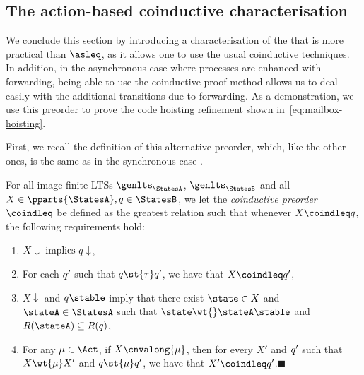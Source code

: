 

\subsection{The action-based coinductive characterisation}
\label{sec:coind-char}

We conclude this section by introducing a characterisation of the
\mustpreorder that is more practical than $\asleq$, as it allows one
to use the usual coinductive techniques.
%
In addition, in the asynchronous case where processes are enhanced with
forwarding, being able to use the coinductive proof method allows us to deal
easily with the additional transitions due to forwarding.
%
As a demonstration, we use this preorder to prove the code hoisting
refinement shown in~\eqref{eq:mailbox-hoisting}.

First, we recall the definition of this alternative preorder,
which, like the other ones, is the same as in the synchronous case
\cite{DBLP:journals/jacm/AcetoH92,DBLP:conf/concur/LaneveP07,DBLP:journals/mscs/BernardiH16}.

\begin{definition}
\label{def:coinductive-char-main}
For all image-finite LTSs $\genlts_\StatesA$, $\genlts_\StatesB$ and all
$X \in \pparts{\StatesA}, \serverB \in \StatesB$,
  we let the \emph{coinductive preorder} $\coindleq$ be defined as
  the greatest relation such that whenever $X \coindleq \serverB$, the following
  requirements hold: \begin{enumerate}
\item $X \downarrow \text{ implies } q \downarrow$,
\item\label{pt:coind-tau-serverB} For each $q'$ such that $\serverB
\st{\tau} \serverB'$, we have that $X \coindleq \serverB'$,

\item\label{pt:coind-acceptance-sets}
  $X \downarrow$ and $\serverB \stable$ imply that there exist
  $\state \in X$ and $\stateA \in \StatesA$ such that
  $\state \wt{} \stateA \stable$ and $R(\stateA) \subseteq R(q)$,

\item\label{pt:coind-continuations-mu} For any $\mu \in \Act$,
  if $X \cnvalong{\mu}$,
  then for every  $X'$ and $q'$
  such that $X \wt{\mu} X'$ and $\serverB \st{\mu} \serverB'$,
  we have that
  $X' \coindleq \serverB'$.\hfill$\blacksquare$
\end{enumerate}
\end{definition}

